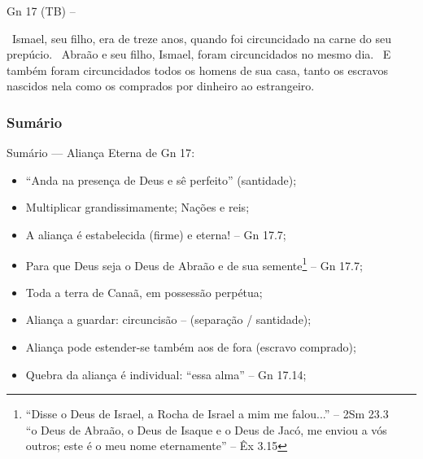 \documentclass[12pt,aspectratio=169]{beamer}
\newcommand{\ver}[1]{%
    \raisebox{0.50ex}{%
        \scalebox{1.1}{%
            \pmb{\textbf{\textcolor{BSpbg}{#1}}}%
        }%
    }%
}
\newcommand{\QUOTE}[1]{%
    \par\noindent\hspace*{0.05\linewidth}%
    \begin{minipage}{0.9\linewidth}%
        \linespread{1.35}\large{#1}%
    \end{minipage}%
}
\newcommand{\RED}[1]{{\textcolor{TXred}{#1}}}
\newcommand{\ORA}[1]{{\textcolor{TXred!50!TXyel}{#1}}}
\newcommand{\YEL}[1]{{\textcolor{TXyel}{#1}}}
\newcommand{\GRE}[1]{{\textcolor{TXgre}{#1}}}
\newcommand{\CYA}[1]{{\textcolor{TXcya}{#1}}}
\newcommand{\BLU}[1]{{\textcolor{TXblu}{#1}}}
\newcommand{\MAG}[1]{{\textcolor{TXmag}{#1}}}
\newcommand{\BRI}[1]{{\textcolor{BSpbg}{#1}}}   %
\begin{document}
\begin{frame}[allowframebreaks]{\BRI{Gn 17} (TB) --}
        \pagebreak

        \QUOTE{%
            \ver{25}~Ismael, seu filho, era de treze anos, quando foi circuncidado na carne do
            seu prepúcio.
            \ver{26}~Abraão e seu filho, Ismael, foram circuncidados no mesmo dia.
            \ver{27}~E também foram circuncidados todos os homens de sua casa, tanto os escravos
            nascidos nela como os comprados por dinheiro ao estrangeiro.
        }

    \end{frame}

    \subsubsection{Sumário}

    \begin{frame}
        \par\noindent\hspace*{0.05\linewidth}%
        \begin{minipage}{0.9\linewidth}%
            \large%
            \begin{alertblock}{Sumário --- \YEL{Aliança Eterna} de \BRI{Gn 17}:}
                \normalsize
                \begin{itemize}
					\item<1-> ``\MAG{Anda na presença} de Deus e \MAG{sê perfeito}'' (santidade);
					\item<1-> Multiplicar \YEL{grandissimamente}; Nações e \GRE{reis};
					\item<1-> A aliança é \YEL{estabelecida} (firme) e \CYA{eterna!} -- Gn 17.7;
					\item<1-> Para que \BLU{Deus seja o Deus de Abraão e de sua
                        semente}\footnote{``Disse o \BLU{Deus de Israel}, a \BLU{Rocha de
                        Israel} a mim me falou...'' -- \BRI{2Sm 23.3} \\ ``o \BLU{Deus de
                        Abraão}, o
                        \BLU{Deus de Isaque} e o \BLU{Deus de Jacó}, me enviou a vós outros;
                        \MAG{este é o meu
                        nome eternamente}'' -- \BRI{Êx 3.15}} -- Gn 17.7;
					\item<1-> Toda a \YEL{terra} de Canaã, em \GRE{possessão} \YEL{perpétua};
					\item<1-> Aliança a guardar: \MAG{circuncisão} -- (separação / santidade);
					\item<1-> Aliança pode estender-se também \ORA{aos de fora} (escravo comprado);
					\item<1-> \RED{Quebra} da aliança é \YEL{individual}: ``\YEL{essa alma}'' -- Gn
						17.14;
                \end{itemize}
            \end{alertblock}
        \end{minipage}%
    \end{frame}
\end{document}
